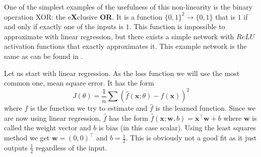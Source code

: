 One of the simplest examples of the usefulness of this non-linearity is the binary operation XOR: the e\textbf{X}clusive \textbf{OR}. It is a function $\{0,1\}^2\rightarrow \{0,1\}$ that is $1$ if and only if exactly one of the inputs is $1$. This function is impossible to approximate with linear regression, but there exists a simple network with $ReLU$ activation functions that exactly approximates it. This example network is the same as can be found in \cite{neural}.

Let us start with linear regression. As the loss function we will use the most common one, mean square error. It has the form
$$J(\theta)=\frac{1}{n}\sum(\widehat{f}(\textbf{x};\theta)-f(\textbf{x}))^2$$
where $f$ is the function we try to estimate and $\widehat{f}$ is the learned function. Since we are now using linear regression, $\widehat{f}$ has the form $\widehat{f}(\textbf{x};\textbf{w},b)=\textbf{x}^\top \textbf{w}+b$ where $\textbf{w}$ is called the weight vector and $b$ is bias (in this case scalar). Using the least squares method we get $\textbf{w}=(0,0)^\top$ and $b=\frac{1}{2}$. This is obviously not a good fit as it just outputs $\frac{1}{2}$ regardless of the input.

